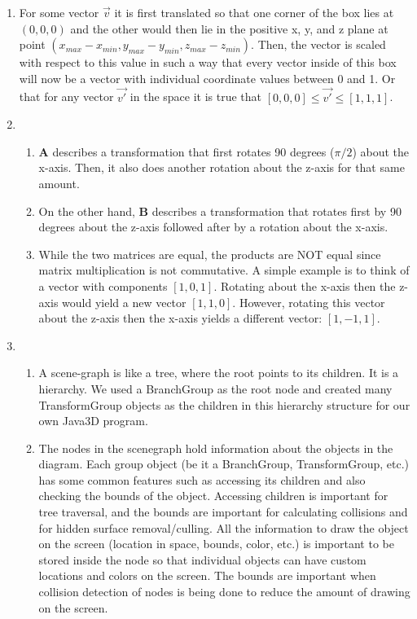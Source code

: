 \documentclass[11pt]{article}
\begin{document}
\begin{enumerate}
  \item For some vector $\vec{v}$ it is first translated so that one corner of the box lies at $(0,0,0)$ and the other would then lie in the positive x, y, and z plane at point $(x_{max} - x_{min},y_{max} - y_{min},z_{max} - z_{min})$. Then, the vector is scaled with respect to this value in such a way that every vector inside of this box will now be a vector with individual coordinate values between 0 and 1. Or that for any vector $\vec{v'}$ in the space it is true that $[0,0,0] \leq \vec{v'} \leq [1,1,1]$.

  \item
    \begin{enumerate}
      \item \textbf{A} describes a transformation that first rotates 90 degrees ($\pi / 2$) about the x-axis. Then, it also does another rotation about the z-axis for that same amount.
      \item On the other hand, \textbf{B} describes a transformation that rotates first by 90 degrees about the z-axis followed after by a rotation about the x-axis.
      \item While the two matrices are equal, the products are NOT equal since matrix multiplication is not commutative. A simple example is to think of a vector with components $[1,0,1]$. Rotating about the x-axis then the z-axis would yield a new vector $[1,1,0]$. However, rotating this vector about the z-axis then the x-axis yields a different vector: $[1,-1,1]$.
    \end{enumerate}

  \item
    \begin{enumerate}
      \item A scene-graph is like a tree, where the root points to its children. It is a hierarchy. We used a BranchGroup as the root node and created many TransformGroup objects as the children in this hierarchy structure for our own Java3D program.
      \item The nodes in the scenegraph hold information about the objects in the diagram. Each group object (be it a BranchGroup, TransformGroup, etc.) has some common features such as accessing its children and also checking the bounds of the object. Accessing children is important for tree traversal, and the bounds are important for calculating collisions and for hidden surface removal/culling. All the information to draw the object on the screen (location in space, bounds, color, etc.) is important to be stored inside the node so that individual objects can have custom locations and colors on the screen. The bounds are important when collision detection of nodes is being done to reduce the amount of drawing on the screen.
    \end{enumerate}


\end{enumerate}
\end{document}
